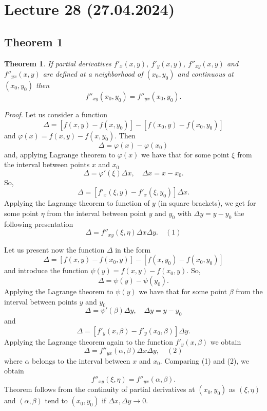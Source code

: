 \documentclass{article}
\newtheorem{theorem}{Theorem}
\begin{document}
\section*{Lecture 28 (27.04.2024)}

\subsection*{Theorem 1}

\begin{theorem}
If partial derivatives $f'_x(x, y)$, $f'_y(x, y)$, $f''_{xy}(x, y)$ and $f''_{yx}(x, y)$ are defined at a neighborhood of $(x_0, y_0)$ and continuous at $(x_0, y_0)$ then
\[
f''_{xy}(x_0, y_0) = f''_{yx}(x_0, y_0).
\]
\end{theorem}

\vspace{1em}

\textit{Proof.} Let us consider a function
\[
\Delta = [f (x, y) - f (x, y_0)] - [f (x_0, y) - f (x_0, y_0)]
\]
and $\varphi(x) = f (x, y) - f (x, y_0)$. Then
\[
\Delta = \varphi(x) - \varphi(x_0)
\]
and, applying Lagrange theorem to $\varphi(x)$ we have that for some point $\xi$ from the interval between points $x$ and $x_0$
\[
\Delta = \varphi'(\xi)\Delta x, \quad \Delta x = x - x_0.
\]
So,
\[
\Delta = [f'_x (\xi, y) - f'_x (\xi, y_0)]\Delta x.
\]
Applying the Lagrange theorem to function of $y$ (in square brackets), we get for some point $\eta$ from the interval between point $y$ and $y_0$ with $\Delta y = y - y_0$ the following presentation
\[
\Delta = f''_{xy}(\xi, \eta)\Delta x \Delta y. \quad (1)
\]

Let us present now the function $\Delta$ in the form
\[
\Delta = [f (x, y) - f (x_0, y)] - [f (x, y_0) - f (x_0, y_0)]
\]
and introduce the function $\psi(y) = f (x, y) - f (x_0, y)$. So,
\[
\Delta = \psi(y) - \psi(y_0).
\]
Applying the Lagrange theorem to $\psi(y)$ we have that for some point $\beta$ from the interval between points $y$ and $y_0$
\[
\Delta = \psi'(\beta)\Delta y, \quad \Delta y = y - y_0
\]
and
\[
\Delta = [f'_y (x, \beta) - f'_y (x_0, \beta)]\Delta y.
\]
Applying the Lagrange theorem again to the function $f'_y (x, \beta)$ we obtain
\[
\Delta = f''_{yx}(\alpha, \beta)\Delta x \Delta y, \quad (2)
\]
where $\alpha$ belongs to the interval between $x$ and $x_0$. Comparing (1) and (2), we obtain
\[
f''_{xy}(\xi, \eta) = f''_{yx}(\alpha, \beta).
\]
Theorem follows from the continuity of partial derivatives at $(x_0, y_0)$ as $(\xi, \eta)$ and $(\alpha, \beta)$ tend to $(x_0, y_0)$ if $\Delta x, \Delta y \to 0$.
\end{document}
